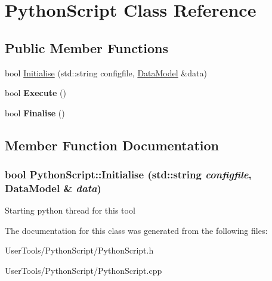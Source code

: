 \hypertarget{classPythonScript}{
\section{PythonScript Class Reference}
\label{classPythonScript}
}
\subsection*{Public Member Functions}
\begin{DoxyCompactItemize}
\item 
bool \hyperlink{classPythonScript_aad6cc6780450e409d2a242c6f4eb3d9a}{Initialise} (std::string configfile, \hyperlink{classDataModel}{DataModel} \&data)
\item 
\hypertarget{classPythonScript_a49e8baf3660437e7257327c2e521fbae}{
bool {\bfseries Execute} ()}
\label{classPythonScript_a49e8baf3660437e7257327c2e521fbae}

\item 
\hypertarget{classPythonScript_ada47375997eb9d29a34f5e88aab016f7}{
bool {\bfseries Finalise} ()}
\label{classPythonScript_ada47375997eb9d29a34f5e88aab016f7}

\end{DoxyCompactItemize}


\subsection{Member Function Documentation}
\hypertarget{classPythonScript_aad6cc6780450e409d2a242c6f4eb3d9a}{
\subsubsection[{Initialise}]{\setlength{\rightskip}{0pt plus 5cm}bool PythonScript::Initialise (std::string {\em configfile}, \/  {\bf DataModel} \& {\em data})}}
\label{classPythonScript_aad6cc6780450e409d2a242c6f4eb3d9a}


Starting python thread for this tool 

The documentation for this class was generated from the following files:\begin{DoxyCompactItemize}
\item 
UserTools/PythonScript/PythonScript.h\item 
UserTools/PythonScript/PythonScript.cpp\end{DoxyCompactItemize}
